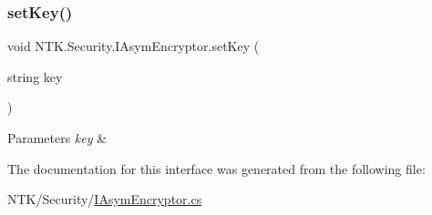 \subsubsection{\texorpdfstring{setKey()}{setKey()}}
{\footnotesize\ttfamily void N\+T\+K.\+Security.\+I\+Asym\+Encryptor.\+set\+Key (\begin{DoxyParamCaption}\item[{string}]{key }\end{DoxyParamCaption})}






\begin{DoxyParams}{Parameters}
{\em key} & \\
\hline
\end{DoxyParams}


The documentation for this interface was generated from the following file\+:\begin{DoxyCompactItemize}
\item 
N\+T\+K/\+Security/\mbox{\hyperlink{_i_asym_encryptor_8cs}{I\+Asym\+Encryptor.\+cs}}\end{DoxyCompactItemize}
